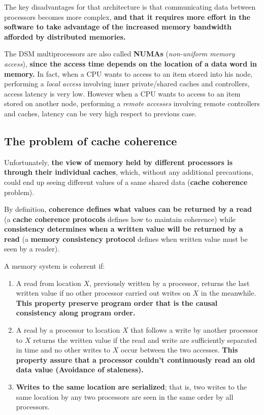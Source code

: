 \documentclass[10pt,a4paper]{article}
\begin{document}
The key disadvantages for that architecture is that communicating data between processors becomes more complex, \textbf{and that it requires more effort in the software to take advantage of the increased memory bandwidth afforded by distributed memories.}

The DSM multiprocessors are also called \textbf{NUMAs} (\textit{non-uniform memory access}), \textbf{since the access time depends on the location of a data word in memory.} In fact, when a CPU wants to access to an item stored into his node, performing a \textit{local access} involving inner private/shared caches and controllers, access latency is very low. However when a CPU wants to access to an item stored on another node, performing a \textit{remote accesses} involving remote controllers and caches, latency can be very high respect to previous case.

\subsection{The problem of cache coherence}

Unfortunately, \textbf{the view of memory held by different processors is through their individual caches}, which, without any additional precautions, could end up seeing different values of a same shared data (\textbf{cache coherence} problem).

By definition, \textbf{coherence defines what values can be returned by a read} (a \textbf{cache coherence protocols} defines how to maintain coherence) while \textbf{consistency determines when a written value will be returned by a read} (a \textbf{memory consistency protocol} defines when written value must be seen by a reader).

A memory system is coherent if:
\begin{enumerate}
\item A read from location $X$, previously written by a processor, returns the last written value if no other processor carried out writes on $X$ in the meanwhile. \textbf{This property preserve program order that is the causal consistency along program order.}

\item A read by a processor to location $X$ that follows a write by another processor to $X$ returns the written value if the read and write are sufficiently separated in time and no other writes to $X$ occur between the two accesses. \textbf{This property assure that a processor couldn't continuously
read an old data value (Avoidance of staleness).}

\item \textbf{Writes to the same location are serialized}; that is, two writes to the same location by any two processors are seen in the same order by all processors.
\end{enumerate}
\end{document}
